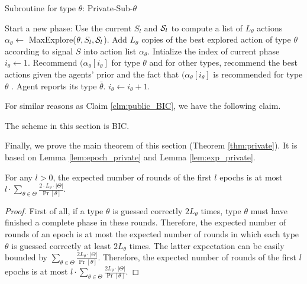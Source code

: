  \begin{algorithm}[H]
    \caption{Subroutine for type $\theta$: Private-Sub-$\theta$ }
    	\label{alg:private_sub}
    \begin{algorithmic}[1]
			\STATE Start a new phase:
				\STATE Use the current $S_l$ and $\S_l$ to compute a list of $L_{\theta}$ actions $\alpha_{\theta} \leftarrow $ MaxExplore($\theta, S_l, \S_l$).
			\ELSE
				\STATE Add $L_{\theta}$ copies of the best explored action of type $\theta$ according to signal $S$ into action list $\alpha_{\theta}$. 
			\ENDIF
			\STATE Intialize the index of current phase $i_{\theta} \leftarrow 1$.
		\ENDIF
		\STATE Recommend $(\alpha_{\theta} [i_{\theta}]$ for type $\theta$ and for other types, recommend the best actions given the agents' prior and the fact that $(\alpha_{\theta} [i_{\theta}]$ is recommended for type $\theta$ .
		\STATE Agent reports its type $\bar{\theta}$.
		\IF {$\bar{\theta} = \theta$}
			\STATE $i_{\theta} \leftarrow i_{\theta} + 1$.
		\ENDIF
	\ENDFOR
     \end{algorithmic}
\end{algorithm}

For similar reasons as Claim \ref{clm:public_BIC}, we have the following claim. 
\begin{claim}
\label{clm:private_BIC}
The scheme in this section is BIC. 
\end{claim}

Finally, we prove the main theorem of this section (Theorem \ref{thm:private}). It is based on Lemma \ref{lem:epoch_private} and Lemma \ref{lem:exp_private}.

\begin{lemma}
\label{lem:epoch_private}
For any $l>0$, the expected number of rounds of the first $l$ epochs is at most $l \cdot \sum_{\theta\in\varTheta} \frac{2\cdot L_{\theta}\cdot |\varTheta|}{\Pr[\theta]}$. 
\end{lemma}

\begin{proof}
First of all, if a type $\theta$ is guessed correctly $2L_{\theta}$ times, type $\theta$ must have finished a complete phase in these rounds. Therefore, the expected number of rounds of an epoch is at most the expected number of rounds in which each type $\theta$ is guessed correctly at least $2L_{\theta}$ times. The latter expectation can be easily bounded by $\sum_{\theta\in\varTheta} \frac{2L_{\theta}\cdot |\varTheta| }{\Pr[\theta]}$. Therefore, the expected number of rounds of the first $l$ epochs is at most $l \cdot \sum_{\theta\in\varTheta} \frac{2L_{\theta}\cdot |\varTheta|}{\Pr[\theta]}$. 
\end{proof}

